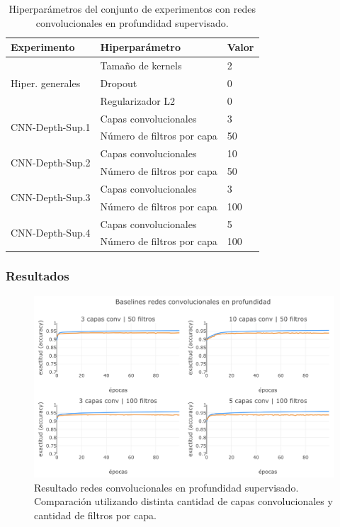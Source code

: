 \begin{table}[h]
    \centering
    \begin{tabular}{|l|l|l|}
        \hline
        \textbf{Experimento} & \textbf{Hiperparámetro} & \textbf{Valor} \\
        \hline
        \multirow{3}{*}{Hiper. generales} & Tamaño de kernels & 2 \\
                              & Dropout & 0 \\
                              & Regularizador L2 & 0 \\
        \hline
        \multirow{2}{*}{CNN-Depth-Sup.1} & Capas convolucionales & 3 \\
                                         & Número de filtros por capa & 50 \\
        \hline
        \multirow{2}{*}{CNN-Depth-Sup.2} & Capas convolucionales & 10 \\
                                         & Número de filtros por capa & 50 \\
        \hline
        \multirow{2}{*}{CNN-Depth-Sup.3} & Capas convolucionales & 3 \\
                                         & Número de filtros por capa & 100 \\
        \hline
        \multirow{2}{*}{CNN-Depth-Sup.4} & Capas convolucionales & 5 \\
                                         & Número de filtros por capa & 100 \\
        \hline
    \end{tabular}
    \caption{Hiperparámetros del conjunto de experimentos con redes convolucionales en profundidad 
    supervisado.}
    \label{tab:exp:cnn_depth_supervised}
\end{table}

\subsubsection{Resultados}

\begin{figure}[t]
\begin{center}
\includegraphics[width=.9\linewidth]{images/CNN_depth_baselines.png}
\caption{Resultado redes convolucionales en profundidad supervisado. Comparación utilizando
distinta cantidad de capas convolucionales y cantidad de filtros por capa.}
\label{fig:CNN_depth_baselines}
\end{center}
\end{figure}

